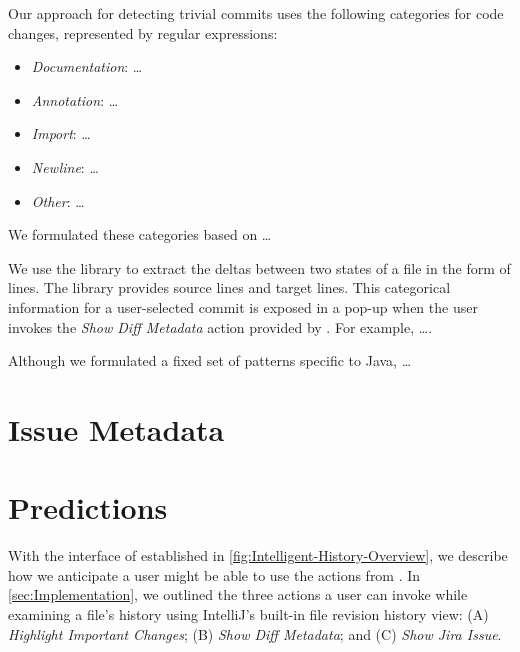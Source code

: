 Our approach for detecting trivial commits uses the following categories for code changes, represented by regular expressions: 

\begin{itemize}
    \item \textit{Documentation}: \dots
    \item \textit{Annotation}: \dots
    \item \textit{Import}: \dots
    \item \textit{Newline}: \dots
    \item \textit{Other}: \dots
\end{itemize}

We formulated these categories based on \dots {}

We use the  \cite{java-diff-utils} library to extract the deltas between two states of a file in the form of lines. 
The library provides source lines and target lines. 
This categorical information for a user-selected commit is exposed in a pop-up when the user invokes the \textit{Show Diff Metadata} action provided by .
For example, \dots {}.

Although we formulated a fixed set of patterns specific to Java, \dots {}

\section{Issue Metadata}
\label{sec:Issue-Metadata}


\section{Predictions}
\label{sec:Predictions}

With the interface of  established in \autoref{fig:Intelligent-History-Overview}, we describe how we anticipate a user might be able to use the actions from . 
In \autoref{sec:Implementation}, we outlined the three actions a user can invoke while examining a file's history using IntelliJ's built-in file revision history view: (A) \textit{Highlight Important Changes}; (B) \textit{Show Diff Metadata}; and (C) \textit{Show Jira Issue}.

\endinput

Any text after an \endinput is ignored.
You could put scraps here or things in progress.